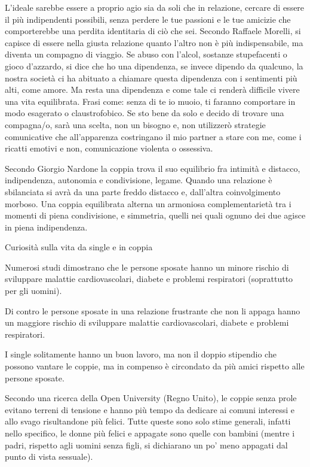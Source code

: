\documentclass[12pt]{book} %
\begin{document}
L'ideale sarebbe essere a proprio agio sia da soli che in relazione, cercare di essere il più indipendenti possibili, senza perdere le tue passioni e le tue amicizie che comporterebbe una perdita identitaria di ciò che sei. 
Secondo Raffaele Morelli, si capisce di essere nella giusta relazione quanto
l'altro non è più indispensabile, ma diventa un compagno di
viaggio. Se abuso con l'alcol, sostanze stupefacenti o
gioco d'azzardo, si dice che ho una dipendenza, se invece dipendo da qualcuno, la nostra società ci ha abituato a chiamare questa dipendenza con i sentimenti più alti, come amore. Ma resta una dipendenza e come tale ci renderà difficile vivere una vita equilibrata. Frasi come: senza di
te io muoio, ti faranno comportare in modo esagerato o claustrofobico. Se sto bene da solo e decido di trovare una
compagna/o, sarà una scelta, non un bisogno e, non utilizzerò strategie comunicative che
all'apparenza costringano il mio partner a stare con me, come i ricatti emotivi e non, comunicazione violenta o ossessiva.

Secondo Giorgio Nardone la coppia trova il suo equilibrio fra intimità e distacco, indipendenza, autonomia e condivisione,
legame. Quando una relazione è sbilanciata si avrà da una parte freddo distacco e, dall'altra
coinvolgimento morboso. Una coppia equilibrata alterna un armoniosa complementarietà tra i momenti di piena
condivisione, e simmetria, quelli nei quali ognuno dei due agisce in piena indipendenza. 


\bigskip
\begin{mdframed}[linewidth=1pt]
Curiosità sulla vita da single e in coppia

Numerosi studi dimostrano che le persone sposate hanno un minore rischio di sviluppare malattie cardiovascolari, diabete
e problemi respiratori (soprattutto per gli uomini).

Di contro le persone sposate in una relazione frustrante che non li appaga hanno un maggiore rischio di sviluppare
malattie cardiovascolari, diabete e problemi respiratori.

I single solitamente hanno un buon lavoro, ma non il doppio stipendio che possono vantare le coppie, ma in compenso è
circondato da più amici rispetto alle persone sposate.

\bigskip

Secondo una ricerca della Open University (Regno
Unito), le coppie senza prole evitano terreni di tensione e hanno più tempo da dedicare ai comuni interessi e allo svago
risultandone più felici. Tutte queste sono solo stime generali, infatti nello specifico, le donne più felici e appagate
sono quelle con bambini (mentre i padri, rispetto agli uomini senza figli, si dichiarano un po' meno appagati dal punto
di vista sessuale).
\end{mdframed}
\end{document}
